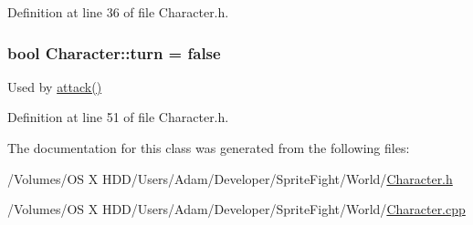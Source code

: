 Definition at line 36 of file Character.\-h.

\hypertarget{class_character_a5195d893143824d0ba34180a94229543}{
\subsubsection[{turn}]{\setlength{\rightskip}{0pt plus 5cm}bool Character\-::turn = false\hspace{0.3cm}{\ttfamily [protected]}}}\label{class_character_a5195d893143824d0ba34180a94229543}
Used by \hyperlink{class_character_a7be3b65a2bc5facbb39ee208f5898560}{attack()} 

Definition at line 51 of file Character.\-h.



The documentation for this class was generated from the following files\-:\begin{DoxyCompactItemize}
\item 
/\-Volumes/\-O\-S X H\-D\-D/\-Users/\-Adam/\-Developer/\-Sprite\-Fight/\-World/\hyperlink{_character_8h}{Character.\-h}\item 
/\-Volumes/\-O\-S X H\-D\-D/\-Users/\-Adam/\-Developer/\-Sprite\-Fight/\-World/\hyperlink{_character_8cpp}{Character.\-cpp}\end{DoxyCompactItemize}
